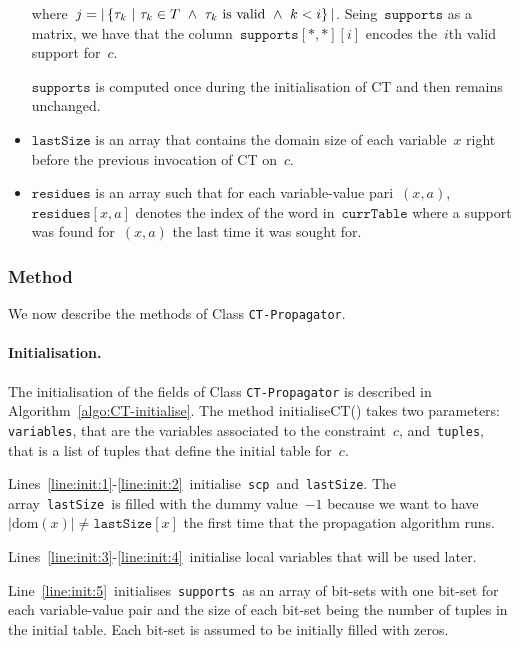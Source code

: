 \documentclass[a4paper,11pt]{article}
\newcommand{\Algoref}[1]{Algorithm~\ref{#1}}
\newcommand{\Dom}[1]{\text{dom}({#1})}
\newcommand{\Scp}{\texttt{scp}}
\newcommand{\CurrTable}{\texttt{currTable}}
\newcommand{\LastSizes}{\texttt{lastSize}}
\newcommand{\Supports}{\texttt{supports}}
\newcommand{\Residues}{\texttt{residues}}
\begin{document}
\begin{itemize}
    where~$j = |\Set{\tau_k \ | \ \tau_k \in T \ \land \ \tau_k \text{~is valid} \ \land \ k < i}|$.
    Seing~$\Supports$ as a matrix, we have that the column~$\Supports[*,*][i]$ encodes
    the~$i$th valid support for~$c$.

    $\Supports$ is computed once during the initialisation of CT and then
    remains unchanged.
    
  \item $\LastSizes$ is an array that contains the domain size of each
    variable~$x$ right before the previous invocation of CT on~$c$.

  \item $\Residues$ is an array such that for each variable-value pari~$(x,a)$,
    $\Residues[x,a]$ denotes the index of the word in~$\CurrTable$ where a support
    was found for~$(x,a)$ the last time it was sought for.

\end{itemize}

\subsubsection{Method}

We now describe the methods of Class \texttt{CT-Propagator}.

\paragraph{Initialisation.}
The initialisation of the fields of Class \texttt{CT-Propagator} is described in
\Algoref{algo:CT-initialise}. The method initialiseCT() takes two parameters:
\texttt{variables}, that are the variables associated to the constraint~$c$,
and~\texttt{tuples}, that is a list of tuples that define the initial table for~$c$.

\newcommand{\Lineref}[1]{Line~\ref{#1}}
\newcommand{\Linesref}[2]{Lines~\ref{#1}-\ref{#2}}

\Linesref{line:init:1}{line:init:2}~initialise~\Scp~and~\LastSizes.
The array~\LastSizes~is filled with 
the dummy value~$-1$ because we
want to have~$|\Dom{x}| \neq \LastSizes[x]$ the first time that the propagation
algorithm runs.

\Linesref{line:init:3}{line:init:4}~initialise local variables that will be 
used later.

\Lineref{line:init:5}~initialises~\Supports~as an array of bit-sets with
one bit-set for each variable-value pair and the size of each bit-set being
the number of tuples in the initial table. Each bit-set is assumed to be
initially filled with zeros.
\end{document}
